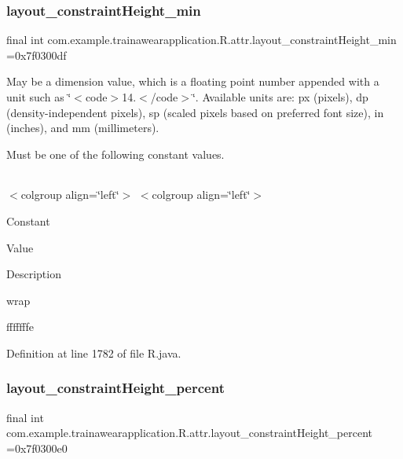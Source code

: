 \subsubsection{\texorpdfstring{layout\_constraintHeight\_min}{layout\_constraintHeight\_min}}
{\footnotesize\ttfamily final int com.\+example.\+trainawearapplication.\+R.\+attr.\+layout\+\_\+constraint\+Height\+\_\+min =0x7f0300df\hspace{0.3cm}{\ttfamily [static]}}

May be a dimension value, which is a floating point number appended with a unit such as \char`\"{}$<$code$>$14.\+5sp$<$/code$>$\char`\"{}. Available units are\+: px (pixels), dp (density-\/independent pixels), sp (scaled pixels based on preferred font size), in (inches), and mm (millimeters). 

Must be one of the following constant values.

\tabulinesep=1mm
\begin{longtabu}spread 0pt [c]{*{0}{|X[-1]}|}
\hline
\end{longtabu}
$<$colgroup align=\char`\"{}left\char`\"{}$>$ $<$colgroup align=\char`\"{}left\char`\"{}$>$ 

Constant

Value

Description 

wrap

fffffffe

Definition at line 1782 of file R.\+java.

\mbox{\label{classcom_1_1example_1_1trainawearapplication_1_1_r_1_1attr_a2854bfe3476b81cc9688ef158d975ffa}} 
\subsubsection{\texorpdfstring{layout\_constraintHeight\_percent}{layout\_constraintHeight\_percent}}
{\footnotesize\ttfamily final int com.\+example.\+trainawearapplication.\+R.\+attr.\+layout\+\_\+constraint\+Height\+\_\+percent =0x7f0300e0\hspace{0.3cm}{\ttfamily [static]}}

